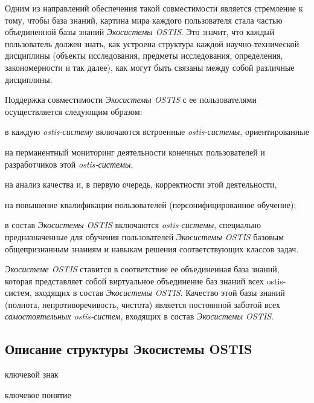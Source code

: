 Одним из направлений обеспечения такой совместимости является стремление к тому, чтобы база знаний, картина мира каждого пользователя стала частью объединенной базы знаний \textit{Экосистемы OSTIS}. Это значит, что каждый пользователь должен знать, как устроена структура каждой научно-технической дисциплины (объекты исследования, предметы исследования, определения, закономерности и так далее), как могут быть связаны между собой различные дисциплины.

Поддержка совместимости \textit{Экосистемы OSTIS} с ее пользователями осуществляется следующим образом:
\begin{textitemize}
    \item в каждую \textit{ostis-систему} включаются встроенные \textit{ostis-системы}, ориентированные
    \begin{textitemize}
        \item на перманентный мониторинг деятельности конечных пользователей и разработчиков этой \textit{ostis-системы},
        \item на анализ качества и, в первую очередь, корректности этой деятельности,
        \item на повышение квалификации пользователей (персонифицированное обучение);
    \end{textitemize}
    \item в состав \textit{Экосистемы OSTIS} включаются \textit{ostis-системы}, специально предназначенные для обучения пользователей \textit{Экосистемы OSTIS} базовым общепризнанным знаниям и навыкам решения соответствующих классов задач.
\end{textitemize}

\textit{Экосистеме OSTIS} ставится в соответствие ее объединенная база знаний, которая представляет собой виртуальное объединение баз знаний всех ostis-систем, входящих в состав \textit{Экосистемы OSTIS}.
Качество этой базы знаний (полнота, непротиворечивость, чистота) является постоянной заботой всех \textit{самостоятельных ostis-систем}, входящих в состав \textit{Экосистемы OSTIS}.


\subsection{Описание структуры Экосистемы OSTIS}
{\label{sec_ecosystem_structure_description}} 

\begin{SCn}
\begin{scnrelfromlist}{ключевой знак}
\end{scnrelfromlist}

\begin{scnrelfromlist}{ключевое понятие}
\end{scnrelfromlist}
\end{SCn}

